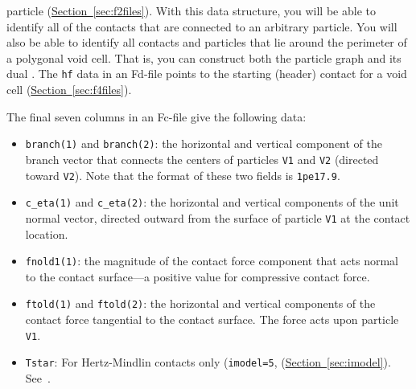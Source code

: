 \documentclass[letterpaper,11pt]{article}
\begin{document}
particle 
(\hyperref[sec:f2files]{Section~\ref*{sec:f2files}}).
With this data structure, you will be able to identify all of
the contacts that are connected to an arbitrary particle.
You will also be able to identify all contacts
and particles that lie around the perimeter of
a polygonal void cell.
That is, you can construct both the particle graph and its dual
\cite{Satake:1992a}.
The \texttt{hf} data in an Fd-file points to the starting
(header) contact for a
void cell
(\hyperref[sec:f4files]{Section~\ref*{sec:f4files}}).
\par
The final seven columns in an Fc-file give the following data:
\begin{itemize}
\item
\texttt{branch(1)} and \texttt{branch(2)}:
the horizontal and vertical component of the branch vector that
connects 
the centers of particles \texttt{V1} and \texttt{V2}
(directed toward \texttt{V2}).  Note that the format of these two
fields is \texttt{1pe17.9}.
\item
\texttt{c\_eta(1)} and \texttt{c\_eta(2)}:
the horizontal and vertical components of the unit normal vector, directed
outward from the surface of particle \texttt{V1}
at the contact location.
\item
\texttt{fnold1(1)}:
the magnitude of the 
contact force component that acts normal to the contact surface---a
positive value for compressive contact force.
\item
\texttt{ftold(1)} and \texttt{ftold(2)}:
the horizontal and vertical components of the contact force
tangential to the contact surface.
The force acts upon particle \texttt{V1}.
\item
\texttt{Tstar}:
For Hertz-Mindlin contacts only (\texttt{imodel=5},
(\hyperref[sec:imodel]{Section~\ref*{sec:imodel}}).
See~\citep{Thornton:1988a}.
\end{itemize}
%
\end{document}
